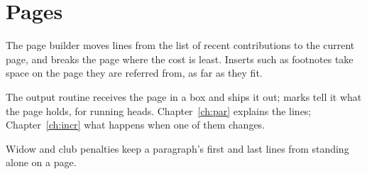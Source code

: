 \chapter{Pages}\label{ch:pages}
The page builder moves lines from the list of recent
contributions to the current page, and breaks the page where the cost is
least. Inserts such as footnotes take space on
the page they are referred from, as far as they fit.

The output routine receives the page in a box and ships
it out; marks tell it what the page holds, for running heads.
Chapter~\ref{ch:par} explains the lines; Chapter~\ref{ch:incr} what happens
when one of them changes.

Widow and club penalties keep a
paragraph's first and last lines from standing alone on a page.
